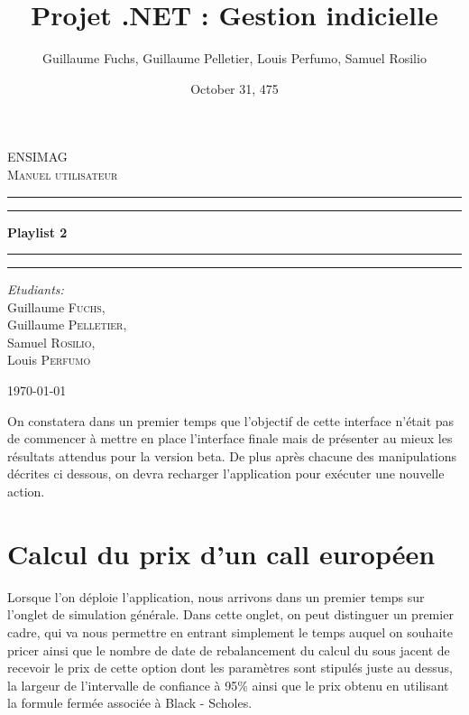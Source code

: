 \documentclass[french,12pt,a4paper]{article}
\title{Projet .NET : Gestion indicielle}
\date{October 31, 475}
\author{Guillaume Fuchs, Guillaume Pelletier, Louis Perfumo, Samuel Rosilio}
\begin{document}
\begin{titlepage}
\begin{center}

\textsc{\LARGE ENSIMAG}\\[1.5cm]

\textsc{\Large Manuel utilisateur}\\[0.5cm]

 \hrule
 \hrule 

\vspace{7mm}
{ \huge \bfseries Playlist 2  }

\vspace{7mm}
\hrule
\hrule

\vspace{7mm}
\begin{minipage}{0.4\textwidth}
\begin{flushleft} \large
\emph{Etudiants:}\\
Guillaume \textsc{Fuchs},\\
Guillaume \textsc{Pelletier},\\
Samuel \textsc{Rosilio},\\
Louis \textsc{Perfumo}
\end{flushleft}
\end{minipage}

\vfill

{\large \today}

\end{center}
\end{titlepage}
\newpage

On constatera dans un premier temps que l'objectif de cette interface n'était pas de commencer à mettre en place l'interface finale mais de présenter au mieux les résultats attendus pour la version beta. De plus après chacune des manipulations décrites ci dessous, on devra recharger l'application pour exécuter une nouvelle action. 

\section{Calcul du prix d'un call européen}

Lorsque l'on déploie l'application, nous arrivons dans un premier temps sur l'onglet de simulation générale. Dans cette onglet, on peut distinguer un premier cadre, qui va nous permettre en entrant simplement le temps auquel on souhaite pricer ainsi que le nombre de date de rebalancement du calcul du sous jacent de recevoir le prix de cette option dont les paramètres sont stipulés juste au dessus, la largeur de l'intervalle de confiance à 95\% ainsi que le prix obtenu en utilisant la formule fermée associée à Black - Scholes.
\end{document}
